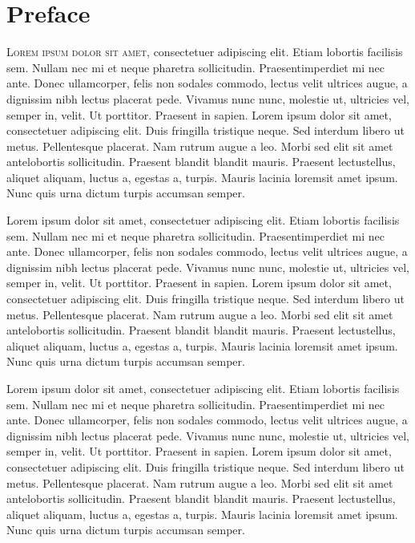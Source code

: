 \chapter{Preface}
\lettrine{L}{orem ipsum dolor sit amet}, consectetuer adipiscing elit. Etiam lobortis facilisis sem. Nullam nec mi et neque pharetra sollicitudin. Praesentimperdiet mi nec ante. Donec ullamcorper, felis non sodales commodo, lectus velit ultrices augue, a dignissim nibh lectus placerat pede. Vivamus nunc nunc, molestie ut, ultricies vel, semper in, velit. Ut porttitor. Praesent in sapien. Lorem ipsum dolor sit amet, consectetuer adipiscing elit. Duis fringilla tristique neque. Sed interdum libero ut metus. Pellentesque placerat. Nam rutrum augue a leo. Morbi sed elit sit amet antelobortis sollicitudin. Praesent blandit blandit mauris. Praesent lectustellus, aliquet aliquam, luctus a, egestas a, turpis. Mauris lacinia loremsit amet ipsum. Nunc quis urna dictum turpis accumsan semper.

Lorem ipsum dolor sit amet, consectetuer adipiscing elit. Etiam lobortis facilisis sem. Nullam nec mi et neque pharetra sollicitudin. Praesentimperdiet mi nec ante. Donec ullamcorper, felis non sodales commodo, lectus velit ultrices augue, a dignissim nibh lectus placerat pede. Vivamus nunc nunc, molestie ut, ultricies vel, semper in, velit. Ut porttitor. Praesent in sapien. Lorem ipsum dolor sit amet, consectetuer adipiscing elit. Duis fringilla tristique neque. Sed interdum libero ut metus. Pellentesque placerat. Nam rutrum augue a leo. Morbi sed elit sit amet antelobortis sollicitudin. Praesent blandit blandit mauris. Praesent lectustellus, aliquet aliquam, luctus a, egestas a, turpis. Mauris lacinia loremsit amet ipsum. Nunc quis urna dictum turpis accumsan semper.

Lorem ipsum dolor sit amet, consectetuer adipiscing elit. Etiam lobortis facilisis sem. Nullam nec mi et neque pharetra sollicitudin. Praesentimperdiet mi nec ante. Donec ullamcorper, felis non sodales commodo, lectus velit ultrices augue, a dignissim nibh lectus placerat pede. Vivamus nunc nunc, molestie ut, ultricies vel, semper in, velit. Ut porttitor. Praesent in sapien. Lorem ipsum dolor sit amet, consectetuer adipiscing elit. Duis fringilla tristique neque. Sed interdum libero ut metus. Pellentesque placerat. Nam rutrum augue a leo. Morbi sed elit sit amet antelobortis sollicitudin. Praesent blandit blandit mauris. Praesent lectustellus, aliquet aliquam, luctus a, egestas a, turpis. Mauris lacinia loremsit amet ipsum. Nunc quis urna dictum turpis accumsan semper.

